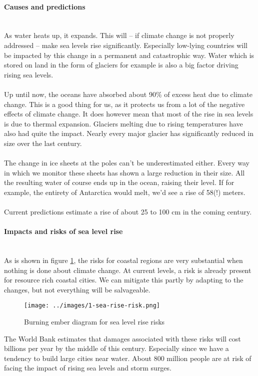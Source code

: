 \documentclass[../summary.tex]{subfiles}
\begin{document}
				\paragraph{Causes and predictions}\mbox{}\\
					As water heats up, it expands. This will -- if climate change is not properly addressed -- make sea levels rise significantly. Especially low-lying countries will be impacted by this change in a permanent and catastrophic way. Water which is stored on land in the form of glaciers for example is also a big factor driving rising sea levels. \\
					\\
					Up until now, the oceans have absorbed about 90\% of excess heat due to climate change. This is a good thing for us, as it protects us from a lot of the negative effects of climate change. It does however mean that most of the rise in sea levels is due to thermal expansion. Glaciers melting due to rising temperatures have also had quite the impact. Nearly every major glacier has significantly reduced in size over the last century.  \\
					\\
					The change in ice sheets at the poles can't be underestimated either. Every way in which we monitor these sheets has shown a large reduction in their size. All the resulting water of course ends up in the ocean, raising their level. If for example, the entirety of Antarctica would melt, we'd see a rise of 58(!) meters. \\
					\\
					Current predictions estimate a rise of about 25 to 100 cm in the coming century.  
				
				\paragraph{Impacts and risks of sea level rise}\mbox{}\\
					As is shown in figure \ref{fig:1-sea-rise-risk}, the risks for coastal regions are very substantial when nothing is done about climate change. At current levels, a risk is already present for resource rich coastal cities. We can mitigate this partly by adapting to the changes, but not everything will be salvageable.\\
					
					\begin{figure}[h]
						\centering
						\texttt{[image: ../images/1-sea-rise-risk.png]}
						\caption{Burning ember diagram for sea level rise risks}
						\label{fig:1-sea-rise-risk}
					\end{figure}
					
					The World Bank estimates that damages associated with these risks will cost billions per year by the middle of this century. Especially since we have a tendency to build large cities near water. About 800 million people are at risk of facing the impact of rising sea levels and storm surges. 
	
\end{document}
